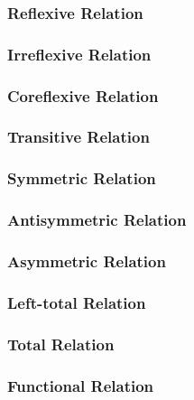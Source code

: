 \subsubsection{Reflexive Relation}\label{sec:reflexive_relation}

\subsubsection{Irreflexive Relation}\label{sec:irreflexive_relation}

\subsubsection{Coreflexive Relation}\label{sec:coreflexive_relation}

\subsubsection{Transitive Relation}\label{sec:transitive_relation}

\subsubsection{Symmetric Relation}\label{sec:symmetric_relation}

\subsubsection{Antisymmetric Relation}\label{sec:antisymmetric_relation}

\subsubsection{Asymmetric Relation}\label{sec:asymmetric_relation}

\subsubsection{Left-total Relation}\label{sec:lefttotal_relation}

\subsubsection{Total Relation}\label{sec:total_relation}

\subsubsection{Functional Relation}\label{sec:functional_relation}

